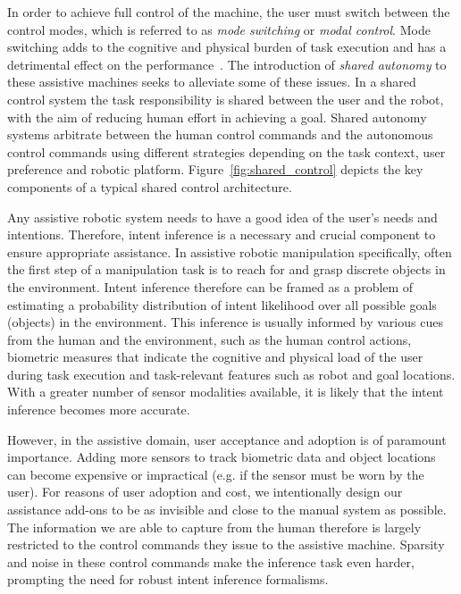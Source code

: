 In order to achieve full control of the machine, the user must switch between the control modes, which is referred to as \textit{mode switching} or \textit{modal control}. Mode switching adds to the cognitive and physical burden of task execution and has a detrimental effect on the performance~\citep{eftring1999technical}. The introduction of \textit{shared autonomy} to these assistive machines seeks to alleviate some of these issues. In a shared control system the task responsibility is shared between the user and the robot, with the aim of reducing human effort in achieving a goal. Shared autonomy systems arbitrate between the human control commands and the autonomous control commands using different strategies depending on the task context, user preference and robotic platform. Figure~\ref{fig:shared_control} depicts the key components of a  typical shared control architecture.

Any assistive robotic system needs to have a good idea of the user's needs and intentions. Therefore, intent inference is a necessary and crucial component to ensure appropriate assistance. In assistive robotic manipulation specifically, often the first step of a manipulation task is to reach for and grasp discrete objects in the environment. Intent inference therefore can be framed as a problem of estimating a probability distribution of intent likelihood over all possible goals (objects) in the environment. This inference is usually informed by various cues from the human and the environment, such as the human control actions, biometric measures that indicate the cognitive and physical load of the user during task execution and task-relevant features such as robot and goal locations. With a greater number of sensor modalities available, it is likely that the intent inference becomes more accurate. 

However, in the assistive domain, user acceptance and adoption is of paramount importance. Adding more sensors to track biometric data and object locations can become expensive or impractical (e.g. if the sensor must be worn by the user). For reasons of user adoption and cost, we intentionally design our assistance add-ons to be as invisible and close to the manual system as possible. The information we are able to capture from the human therefore is largely restricted to the control commands they issue to the assistive machine. Sparsity and noise in these control commands make the inference task even harder, prompting the need for robust intent inference formalisms. 

